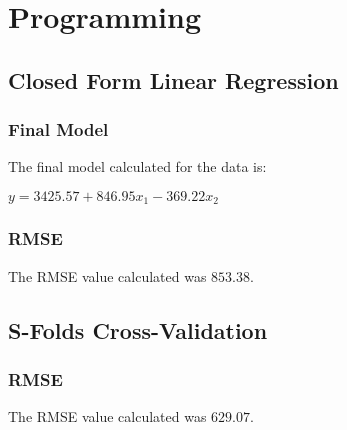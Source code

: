 \documentclass[12pt]{article}
\begin{document}
\section{Programming}
\subsection{Closed Form Linear Regression}
\subsubsection{Final Model}
\noindent
The final model calculated for the data is:

\begin{center}
    $
    y = 3425.57 + 846.95 x_{1} - 369.22 x_{2}
    $
\end{center}

\subsubsection{RMSE}
\noindent
The RMSE value calculated was $853.38$.

\newpage
\subsection{S-Folds Cross-Validation}
\subsubsection{RMSE}
\noindent
The RMSE value calculated was $629.07$.
\end{document}
